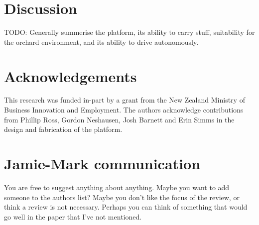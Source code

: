 \documentclass[preprint,authoryear,12pt]{elsarticle}
\begin{document}
\section{Discussion}
    TODO: Generally summerise the platform, its ability to carry stuff, suitability for the orchard environment, and its ability to drive autonomously.

\section*{Acknowledgements}
This research was funded in-part by a grant from the New Zealand Ministry of Business Innovation and Employment.
The authors acknowledge contributions from Phillip Ross, Gordon Neshausen, Josh Barnett and Erin Simms in the design and fabrication of the platform.

\section{Jamie-Mark communication}
You are free to suggest anything about anything.
Maybe you want to add someone to the authors list?
Maybe you don't like the focus of the review, or think a review is not necessary.
Perhaps you can think of something that would go well in the paper that I've not mentioned.





\end{document}
